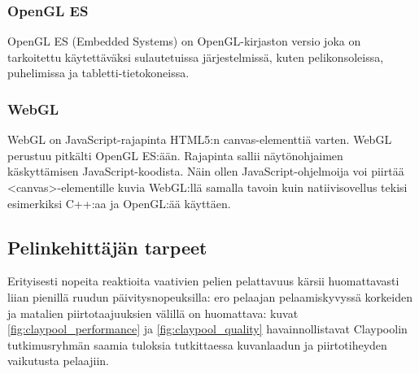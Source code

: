 \subsubsection{OpenGL ES}
OpenGL ES (Embedded Systems) on OpenGL-kirjaston versio joka on tarkoitettu käytettäväksi sulautetuissa järjestelmissä, kuten pelikonsoleissa, puhelimissa ja tabletti-tietokoneissa\cite{opengles}. 

\subsubsection{WebGL}
WebGL on JavaScript-rajapinta HTML5:n canvas-elementtiä varten. WebGL perustuu pitkälti OpenGL ES:ään\cite{webgl_specification}. Rajapinta sallii näytönohjaimen käskyttämisen JavaScript-koodista. Näin ollen JavaScript-ohjelmoija voi piirtää <canvas>-elementille kuvia WebGL:llä samalla tavoin kuin natiivisovellus tekisi esimerkiksi C++:aa ja OpenGL:ää käyttäen.

\subsection{Pelinkehittäjän tarpeet}
Erityisesti nopeita reaktioita vaativien pelien pelattavuus kärsii huomattavasti liian pienillä ruudun päivitysnopeuksilla: ero pelaajan pelaamiskyvyssä korkeiden ja matalien piirtotaajuuksien välillä on huomattava: kuvat \ref{fig:claypool_performance} ja \ref{fig:claypool_quality} havainnollistavat Claypoolin tutkimusryhmän saamia tuloksia tutkittaessa kuvanlaadun ja piirtotiheyden vaikutusta pelaajiin. 

